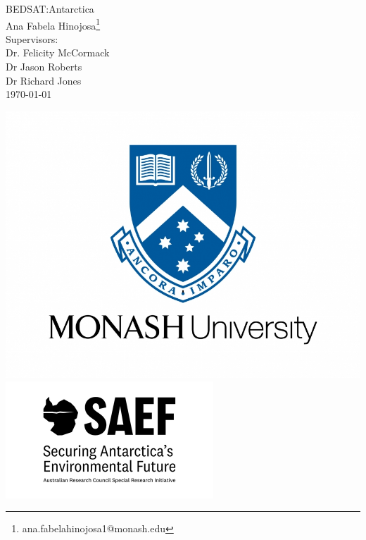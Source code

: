 \documentclass[12pt, a4paper, openany]{book}
\begin{document}
\begin{titlepage}
\begin{center}
    {\Huge BEDSAT:Antarctica}\\ [1cm] 
    \vspace{3cm}
    {\large Ana Fabela Hinojosa\footnote{ana.fabelahinojosa1@monash.edu}}\\ [1cm]
    Supervisors:\\
    Dr. Felicity McCormack\\
    Dr Jason Roberts\\
    Dr Richard Jones\\ [2cm]
    \monthyeardate\today\\ [9.5cm]
    \end{center}
    \includegraphics[scale=0.12]{monash.jpg}\includegraphics[scale=0.6]{SAEF.png}\\ [1cm]

\end{titlepage}


\end{document}

